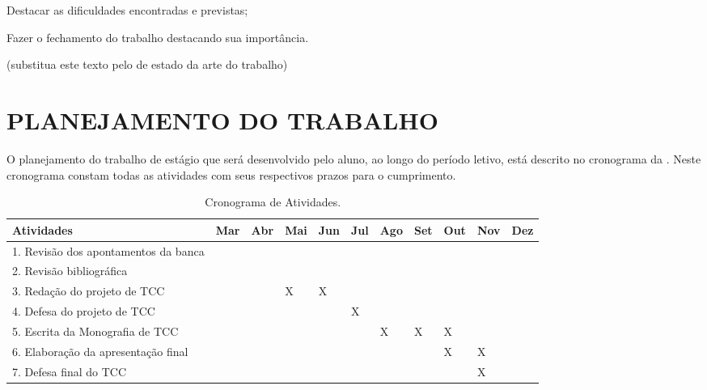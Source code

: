 Destacar as dificuldades encontradas e previstas;

Fazer o fechamento do trabalho destacando sua importância.

(substitua este texto pelo de estado da arte do trabalho)

\section{PLANEJAMENTO DO TRABALHO}
\label{sec:planejamento}
O planejamento do trabalho de estágio que será desenvolvido pelo aluno, ao longo do período letivo, está descrito no cronograma da . Neste cronograma constam todas as atividades com seus respectivos prazos para o cumprimento.


\begin{table}[!htb]
	\caption{Cronograma de Atividades.\label{tab:tabela01}}
	\begin{tabular}{p{4.5cm}|p{0.7cm}|p{0.7cm}|p{0.7cm}|p{0.7cm}|p{0.7cm}|p{0.7cm}|p{0.7cm}|p{0.7cm}|p{0.7cm}|p{0.7cm}}
		\hline
		\textbf{Atividades} & \textbf{Mar} & \textbf{Abr} & \textbf{Mai} & \textbf{Jun} & \textbf{Jul} & \textbf{Ago} & \textbf{Set} & \textbf{Out} & \textbf{Nov} & \textbf{Dez} \\
		\hline
		\small{1. Revisão dos apontamentos da banca} &   &   &   &   &   &   &   &   &   &  \\
		\hline
		\small{2. Revisão bibliográfica} &   &   &   &   &   &   &   &   &   &  \\
		\hline
		\small{3. Redação do projeto de TCC} &   &   & X & X &   &   &   &   &   &  \\
		\hline
		\small{4. Defesa do projeto de TCC} &   &   &   &   & X &   &   &   &   &  \\
		\hline
		\small{5. Escrita da Monografia de TCC} &   &   &   &   &   & X & X  & X &   &  \\
		\hline
		\small{6. Elaboração da apresentação final} &   &   &   &   &   &   &   & X & X &  \\
		\hline
		\small{7. Defesa final do TCC} &   &   &   &   &   &   &   &   & X &  \\
		\hline
	\end{tabular}
\end{table}


